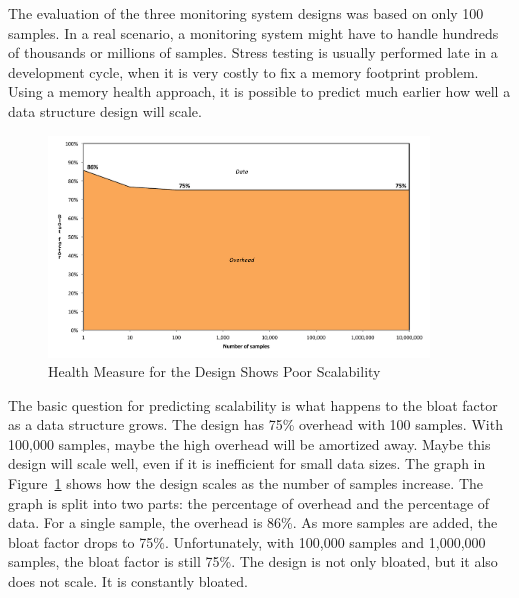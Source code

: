 The evaluation of the three monitoring system designs was based on only 100
samples. In a real scenario, a monitoring system might have to handle hundreds
of thousands or millions of samples. Stress testing is usually performed late
in a development cycle, when it is very costly to fix a memory footprint
problem. Using a memory health approach, it is possible to predict much
earlier how well a data structure design will scale.
 
\begin{figure}
  \centering
   \includegraphics[width=0.9\textwidth]{part1/Figures/memoryhealth/scalable-health-treemap}
  \caption{Health Measure for the  Design Shows Poor Scalability}
  \label{fig:scalable-health-treemap}
\end{figure}
The basic question for predicting scalability is what happens to the bloat
factor as a data structure grows. The  design has 75\% overhead
with 100 samples. With 100,000 samples, maybe the high overhead will be
amortized away. Maybe this design will scale well, even if it is inefficient for
small data sizes. The graph in Figure~\ref{fig:scalable-health-treemap}
shows how the  design scales as the number of samples increase.
The graph is split into two parts: the percentage of overhead and the percentage
of data. For a single sample, the overhead is 86\%. As more samples are added,
the bloat factor drops to 75\%. Unfortunately, with 100,000 samples and
1,000,000 samples, the bloat factor is still 75\%. The  design is
not only bloated, but it also does not scale. It is constantly bloated.



